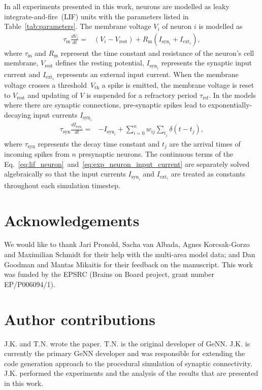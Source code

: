 \documentclass[9pt,a4paper]{amsart}
\begin{document}
In all experiments presented in this work, neurons are modelled as leaky integrate-and-fire~(LIF) units with the parameters listed in Table~\ref{tab:parameters}.
The membrane voltage $V_{i}$ of neuron $i$ is modelled as
%
\begin{align}
    \tau_{\text{m}} \frac{dV_{i}}{dt} = & (V_{i} - V_{\text{rest}}) + R_{\text{m}}(I_{\text{syn}_{i}} + I_{\text{ext}_{i}}), \label{eq:lif_neuron}
\end{align}
%
where $\tau_{\text{m}}$ and $R_{\text{m}}$ represent the time constant and resistance of the neuron's cell membrane, $V_{\text{rest}}$ defines the resting potential, $I_{\text{syn}_{i}}$ represents the synaptic input current and $I_{\text{ext}_i}$ represents an external input current.
When the membrane voltage crosses a threshold~$V_{\text{th}}$ a spike is emitted, the membrane voltage is reset to $V_{\text{rest}}$ and updating of $V$ is suspended for a refractory period $\tau_{\text{ref}}$.
In the models where there are synaptic connections, pre-synaptic spikes lead to exponentially-decaying input currents $I_{\text{syn}_{i}}$
%
\begin{align}
    \tau_{\text{syn}} \frac{dI_{\text{syn}_{i}}}{dt} = & -I_{\text{syn}_{i}} + \sum_{i=0}^{n} w_{ij} \sum_{t_{j}}  \delta(t - t_{j}),\label{eq:exp_neuron_input_current}
\end{align}
%
where $\tau_{\text{syn}}$ represents the decay time constant and $t_{j}$ are the arrival times of incoming spikes from $n$ presynaptic neurons.
The continuous terms of the Eq.~\ref{eq:lif_neuron}~and~\ref{eq:exp_neuron_input_current} are separately solved algebraically so that the input currents $I_{\text{syn}_{i}}$ and $I_{\text{ext}_{i}}$ are treated as constants throughout each simulation timestep.

\section{Acknowledgements}
We would like to thank Jari Pronold, Sacha van Albada, Agnes Korcsak-Gorzo and Maximilian Schmidt for their help with the multi-area model data; and Dan Goodman and Mantas Mikaitis for their feedback on the manuscript.
This work was funded by the EPSRC (Brains on Board project, grant number EP/P006094/1).

\section{Author contributions}
J.K. and T.N. wrote the paper.
T.N. is the original developer of GeNN.
J.K. is currently the primary GeNN developer and was responsible for extending the code generation approach to the procedural simulation of synaptic connectivity.
J.K. performed the experiments and the analysis of the results that are presented in this work.
\end{document}
